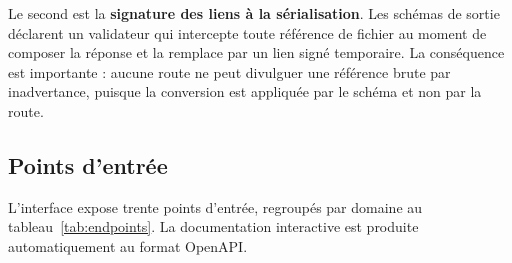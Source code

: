 Le second est la \textbf{signature des liens à la sérialisation}. Les schémas de
sortie déclarent un validateur qui intercepte toute référence de fichier au moment de
composer la réponse et la remplace par un lien signé temporaire. La conséquence est
importante : aucune route ne peut divulguer une référence brute par inadvertance,
puisque la conversion est appliquée par le schéma et non par la route.

\subsection{Points d'entrée}

L'interface expose trente points d'entrée, regroupés par domaine au
tableau~\ref{tab:endpoints}. La documentation interactive est produite automatiquement
au format OpenAPI.

